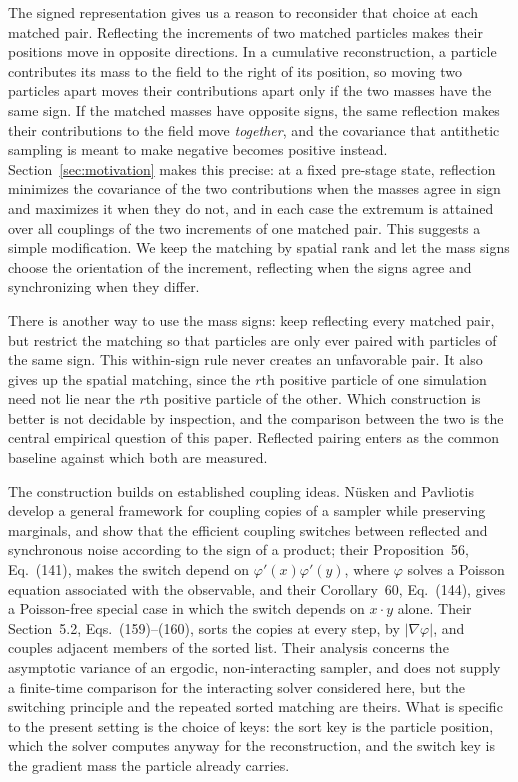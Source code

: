 \documentclass[smallextended,nospthms]{svjour3}
\theoremstyle{plain}
\theoremstyle{definition}
\theoremstyle{remark}
\numberwithin{equation}{section}
\begin{document}
The signed representation gives us a reason to reconsider that choice at each
matched pair. Reflecting the increments of two matched particles
makes their positions move in opposite directions. In a cumulative
reconstruction, a particle contributes its mass to the field to the right of
its position, so moving two particles apart moves their contributions apart
only if the two masses have the same sign. If the matched masses have opposite
signs, the same reflection makes their contributions to the field move
\emph{together}, and the covariance that antithetic sampling is meant to make
negative becomes positive instead. Section~\ref{sec:motivation} makes this
precise: at a fixed pre-stage state, reflection minimizes the covariance of the two
contributions when the masses agree in sign and maximizes it when they do not,
and in each case the extremum is attained over all couplings of the two
increments of one matched pair. This suggests a simple modification. We keep the matching by
spatial rank and let the mass signs choose the orientation of the increment,
reflecting when the signs agree and synchronizing when they differ.

There is another way to use the mass signs: keep reflecting every matched pair,
but restrict the matching so
that particles are only ever paired with particles of the same sign. This
within-sign rule never creates an unfavorable pair. It also gives up the
spatial matching, since the $r$th positive particle of one simulation need not
lie near the $r$th positive particle of the other. Which construction is better is not
decidable by inspection, and the comparison between the two is the central
empirical question of this paper. Reflected pairing enters as the common
baseline against which both are measured.

The construction builds on established coupling ideas. Nüsken and
Pavliotis~\citep{nusken2018} develop a general
framework for coupling copies of a sampler while preserving marginals, and show
that the efficient coupling switches between reflected and synchronous noise
according to the sign of a product; their Proposition~56, Eq.~(141), makes the switch
depend on $\varphi'(x)\varphi'(y)$, where $\varphi$ solves a Poisson equation
associated with the observable, and their Corollary~60, Eq.~(144), gives a
Poisson-free special case in which the switch depends on $x\cdot y$ alone. Their
Section~5.2, Eqs.~(159)--(160), sorts the copies at every step, by $|\nabla\varphi|$, and couples
adjacent members of the sorted list. Their analysis concerns the asymptotic
variance of an ergodic, non-interacting sampler, and does not supply a
finite-time comparison for the interacting solver considered here, but the
switching principle and the repeated sorted matching are theirs. What is
specific to the present setting is the choice of keys: the sort key is the
particle position, which the solver computes anyway for the reconstruction, and
the switch key is the gradient mass the particle already carries.
\end{document}

